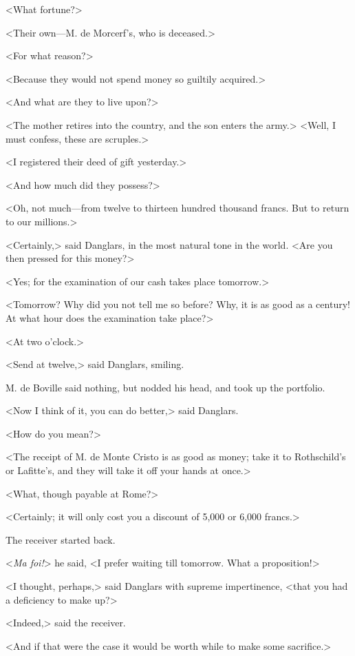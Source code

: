  <What fortune?> 

 <Their own—M. de Morcerf's, who is deceased.> 

 <For what reason?> 

 <Because they would not spend money so guiltily acquired.> 

 <And what are they to live upon?> 

 <The mother retires into the country, and the son enters the army.>  <Well, I must confess, these are scruples.> 

 <I registered their deed of gift yesterday.> 

 <And how much did they possess?> 

 <Oh, not much—from twelve to thirteen hundred thousand francs. But to return to our millions.> 

 <Certainly,> said Danglars, in the most natural tone in the world. <Are you then pressed for this money?> 

 <Yes; for the examination of our cash takes place tomorrow.> 

 <Tomorrow? Why did you not tell me so before? Why, it is as good as a century! At what hour does the examination take place?> 

 <At two o'clock.> 

 <Send at twelve,> said Danglars, smiling. 

 M. de Boville said nothing, but nodded his head, and took up the portfolio. 

 <Now I think of it, you can do better,> said Danglars. 

 <How do you mean?> 

 <The receipt of M. de Monte Cristo is as good as money; take it to Rothschild's or Lafitte's, and they will take it off your hands at once.> 

 <What, though payable at Rome?> 

 <Certainly; it will only cost you a discount of 5,000 or 6,000 francs.> 

 The receiver started back. 

 <\textit{Ma foi!}> he said, <I prefer waiting till tomorrow. What a proposition!> 

 <I thought, perhaps,> said Danglars with supreme impertinence, <that you had a deficiency to make up?> 

 <Indeed,> said the receiver. 

 <And if that were the case it would be worth while to make some sacrifice.> 

